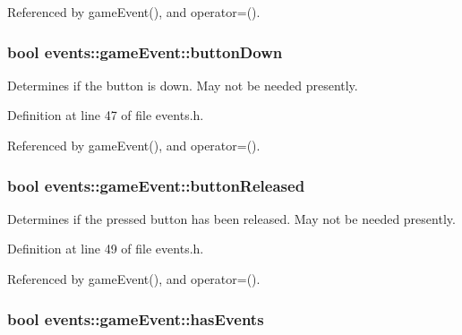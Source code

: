 Referenced by game\+Event(), and operator=().

\hypertarget{structevents_1_1game_event_ab89824ec88726cc79e11869d38d56aed}{}
\subsubsection[{button\+Down}]{\setlength{\rightskip}{0pt plus 5cm}bool events\+::game\+Event\+::button\+Down}\label{structevents_1_1game_event_ab89824ec88726cc79e11869d38d56aed}


Determines if the button is down. May not be needed presently. 



Definition at line 47 of file events.\+h.



Referenced by game\+Event(), and operator=().

\hypertarget{structevents_1_1game_event_ab0db744a869247106087de674e7dbfca}{}
\subsubsection[{button\+Released}]{\setlength{\rightskip}{0pt plus 5cm}bool events\+::game\+Event\+::button\+Released}\label{structevents_1_1game_event_ab0db744a869247106087de674e7dbfca}


Determines if the pressed button has been released. May not be needed presently. 



Definition at line 49 of file events.\+h.



Referenced by game\+Event(), and operator=().

\hypertarget{structevents_1_1game_event_a96b2729eb6d01e42431da7ac1a4d28a2}{}
\subsubsection[{has\+Events}]{\setlength{\rightskip}{0pt plus 5cm}bool events\+::game\+Event\+::has\+Events}\label{structevents_1_1game_event_a96b2729eb6d01e42431da7ac1a4d28a2}


